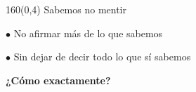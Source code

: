 \documentclass[shownotes,aspectratio=169]{beamer}
\begin{document}
\begin{frame}[plain]
\begin{textblock}{160}(0,4) \centering
\LARGE Sabemos no mentir \\
\end{textblock}
\vspace{2cm}



\Large

\centering

$\bullet$ No afirmar más de lo que sabemos \pause

$\bullet$ Sin dejar de decir todo lo que sí sabemos

\pause \centering \vspace{1cm}

\Large

\textbf{¿Cómo exactamente?}


\end{frame}
\end{document}
